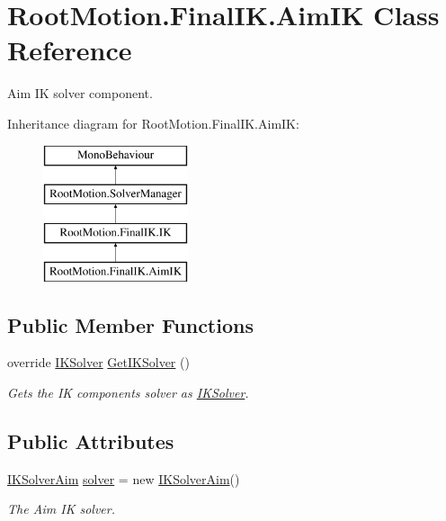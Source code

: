 \hypertarget{class_root_motion_1_1_final_i_k_1_1_aim_i_k}{}\section{Root\+Motion.\+Final\+I\+K.\+Aim\+IK Class Reference}
\label{class_root_motion_1_1_final_i_k_1_1_aim_i_k}


Aim IK solver component.  


Inheritance diagram for Root\+Motion.\+Final\+I\+K.\+Aim\+IK\+:\begin{figure}[H]
\begin{center}
\leavevmode
\includegraphics[height=4.000000cm]{class_root_motion_1_1_final_i_k_1_1_aim_i_k}
\end{center}
\end{figure}
\subsection*{Public Member Functions}
\begin{DoxyCompactItemize}
\item 
override \mbox{\hyperlink{class_root_motion_1_1_final_i_k_1_1_i_k_solver}{I\+K\+Solver}} \mbox{\hyperlink{class_root_motion_1_1_final_i_k_1_1_aim_i_k_a32e4e1392cf1b39a33e5bb2c8022f941}{Get\+I\+K\+Solver}} ()
\begin{DoxyCompactList}\small\item\em Gets the IK component\textquotesingle{}s solver as \mbox{\hyperlink{class_root_motion_1_1_final_i_k_1_1_i_k_solver}{I\+K\+Solver}}. \end{DoxyCompactList}\end{DoxyCompactItemize}
\subsection*{Public Attributes}
\begin{DoxyCompactItemize}
\item 
\mbox{\hyperlink{class_root_motion_1_1_final_i_k_1_1_i_k_solver_aim}{I\+K\+Solver\+Aim}} \mbox{\hyperlink{class_root_motion_1_1_final_i_k_1_1_aim_i_k_ac5a13750eca876add0b9a5c3f57d2bda}{solver}} = new \mbox{\hyperlink{class_root_motion_1_1_final_i_k_1_1_i_k_solver_aim}{I\+K\+Solver\+Aim}}()
\begin{DoxyCompactList}\small\item\em The Aim IK solver. \end{DoxyCompactList}\end{DoxyCompactItemize}
